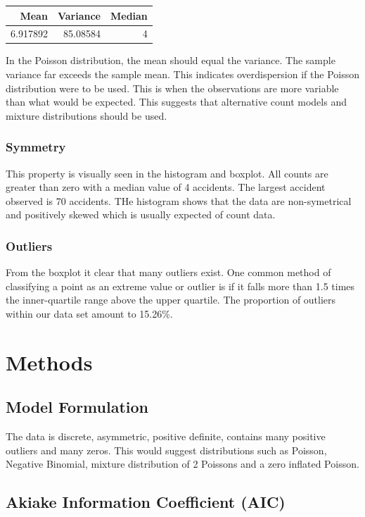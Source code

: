 \documentclass[11pt,preprint, authoryear]{elsarticle}
\numberwithin{equation}{section}
\numberwithin{figure}{section}
\numberwithin{table}{section}
\begin{document}
\begin{longtable}[]{@{}rrr@{}}
\toprule
Mean & Variance & Median\tabularnewline
\midrule
\endhead
6.917892 & 85.08584 & 4\tabularnewline
\bottomrule
\end{longtable}

In the Poisson distribution, the mean should equal the variance. The
sample variance far exceeds the sample mean. This indicates
overdispersion if the Poisson distribution were to be used. This is when
the observations are more variable than what would be expected. This
suggests that alternative count models and mixture distributions should
be used.

\subsubsection{Symmetry}\label{symmetry}

This property is visually seen in the histogram and boxplot. All counts
are greater than zero with a median value of 4 accidents. The largest
accident observed is 70 accidents. THe histogram shows that the data are
non-symetrical and positively skewed which is usually expected of count
data.

\subsubsection{Outliers}\label{outliers}

From the boxplot it clear that many outliers exist. One common method of
classifying a point as an extreme value or outlier is if it falls more
than 1.5 times the inner-quartile range above the upper quartile. The
proportion of outliers within our data set amount to 15.26\%.

\section{Methods}\label{methods}

\subsection{Model Formulation}\label{model-formulation}

The data is discrete, asymmetric, positive definite, contains many
positive outliers and many zeros. This would suggest distributions such
as Poisson, Negative Binomial, mixture distribution of 2 Poissons and a
zero inflated Poisson.

\subsection{Akiake Information Coefficient
(AIC)}\label{akiake-information-coefficient-aic}
\end{document}
